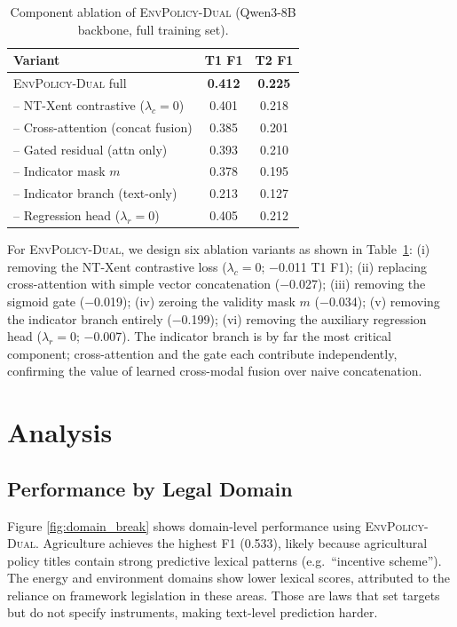 \documentclass[11pt]{article}
\newcommand{\ours}{\textsc{EnvPolicy-Dual}}
\begin{document}
\begin{table}[t]
\centering\small
\begin{tabular}{@{}lcc@{}}
\toprule
\textbf{Variant} & \textbf{T1 F1} & \textbf{T2 F1} \\
\midrule
\ours{} full                           & \textbf{0.412} & \textbf{0.225} \\
\;-- NT-Xent contrastive ($\lambda_c=0$) & 0.401 & 0.218 \\
\;-- Cross-attention (concat fusion)   & 0.385 & 0.201 \\
\;-- Gated residual (attn only)        & 0.393 & 0.210 \\
\;-- Indicator mask $m$                & 0.378 & 0.195 \\
\;-- Indicator branch (text-only)      & 0.213 & 0.127 \\
\;-- Regression head ($\lambda_r=0$)   & 0.405 & 0.212 \\
\bottomrule
\end{tabular}
\caption{Component ablation of \ours{} (Qwen3-8B backbone, full training set).}
\label{tab:abl}
\end{table}





For \ours{}, we design six ablation variants as shown in Table~\ref{tab:abl}: (i) removing the NT-Xent contrastive loss ($\lambda_c=0$; $-$0.011 T1 F1); (ii) replacing cross-attention with simple vector concatenation ($-$0.027); (iii) removing the sigmoid gate ($-$0.019); (iv) zeroing the validity mask $m$ ($-$0.034); (v) removing the indicator branch entirely ($-$0.199); (vi) removing the auxiliary regression head ($\lambda_r=0$; $-$0.007). The indicator branch is by far the most critical component; cross-attention and the gate each contribute independently, confirming the value of learned cross-modal fusion over naive concatenation.

\section{Analysis}
\label{sec:analysis}

\subsection{Performance by Legal Domain}
Figure \ref{fig:domain_break} shows domain-level performance using  \ours.
Agriculture achieves the highest F1 (0.533), likely because agricultural
policy titles contain strong predictive lexical patterns (e.g.\ ``incentive
scheme''). The energy and environment domains show lower lexical scores, attributed to the reliance on framework legislation in these areas. Those are laws that set targets but do not specify instruments, making text-level prediction harder. 
\end{document}
